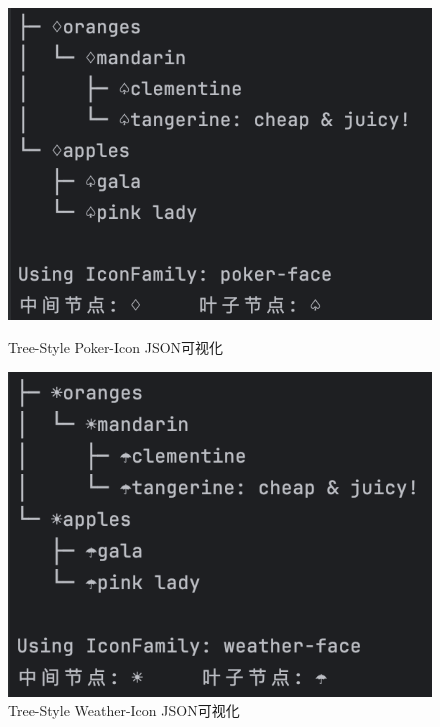 \documentclass[hyperref,a4paper,UTF8]{ctexart}
\begin{document}
\begin{figure}[htbp]
\centering
\begin{minipage}[t]{0.48\textwidth}
    \centering
    \includegraphics[width=\textwidth]{figures/tre-pok.png}
    \caption{Tree-Style Poker-Icon JSON可视化}
    \label{fig:tre-pok}
\end{minipage}
\hfill
\begin{minipage}[t]{0.48\textwidth}
    \centering
    \includegraphics[width=\textwidth]{figures/tre-wea.png}
    \caption{Tree-Style Weather-Icon JSON可视化}
    \label{fig:tre-wea}
\end{minipage}
\end{figure}
\end{document}
